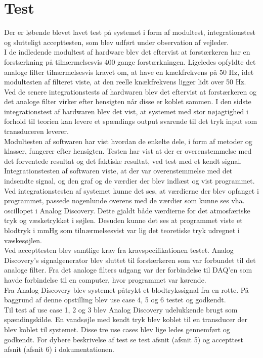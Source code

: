 \section{Test}
Der er løbende blevet lavet test på systemet i form af  modultest, integrationstest og slutteligt accepttesten, som blev udført under observation af vejleder.\\ 
I de indledende modultest af hardware blev det eftervist at forstærkeren har en forstærkning på tilnærmelsesvis 400 gange forstærkningen. Ligeledes opfyldte det analoge filter tilnærmelsesvis kravet om, at have en knækfrekvens på 50 Hz, idet modultesten af filteret viste, at den reelle knækfrekvens ligger lidt over 50 Hz. Ved de senere integrationstests af hardwaren blev det eftervist at forstærkeren og det analoge filter virker efter hensigten når disse er koblet sammen. I den sidste integrationstest af hardwaren blev det vist, at systemet med stor nøjagtighed i forhold til teorien kan levere et spændings output svarende til det tryk input som transduceren leverer.\\[2ex]
Modultesten af softwaren har vist hvordan de enkelte dele, i form af metoder og klasser, fungerer efter hensigten. Testen har vist at der er overenstemmelse med det forventede resultat og det faktiske resultat, ved test med et kendt signal. \\
Integrationstesten af softwaren viste, at der var overenstemmelse med det indsendte signal, og den graf og de værdier der blev indlæst og vist programmet.\\[1ex]
Ved integrationstesten af systemet kunne det ses, at værdierne der blev opfanget i programmet, passede nogenlunde overens med de værdier som kunne ses vha. oscillopet i Analog Discovery. Dette gjaldt både værdierne for det atmosfæriske tryk og væsketrykket i søjlen. Desuden kunne det ses at programmet viste et blodtryk i mmHg som tilnærmelsesvist var lig det teoretiske tryk udregnet i væskesøjlen. \\
Ved accepttesten blev samtlige krav fra kravspecifikationen testet. Analog Discovery's signalgenerator blev sluttet til forstærkeren som var forbundet til det analoge filter. Fra det analoge filters udgang var der forbindelse til DAQ'en som havde forbindelse til en computer, hvor programmet var kørende.\\
Fra Analog Discovery blev systemet påtrykt et blodtrykssignal fra en rotte. På baggrund af denne opstilling blev use case 4, 5 og 6 testet og godkendt.\\
Til test af use case 1, 2 og 3 blev Analog Discovery udelukkende brugt som spændingskilde. En vandsøjle med kendt tryk blev koblet til en transducer der blev koblet til systemet. Disse tre use cases blev lige ledes gennemført og godkendt. For dybere beskrivelse af test se test afsnit (afsnit 5) og accepttest afsnit (afsnit 6) i dokumentationen.

